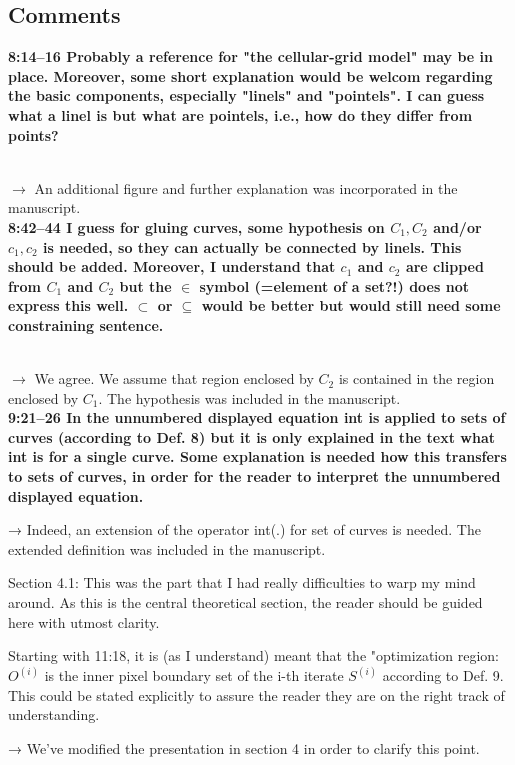 \documentclass[12pt]{article}
\begin{document}
\subsection{Comments}

\textbf{8:14--16 Probably a reference for "the cellular-grid model" may be in place.
Moreover, some short explanation would be welcom regarding the basic
components, especially "linels" and "pointels". I can guess what a linel is
but what are pointels, i.e., how do they differ from points?}

~\\
$\rightarrow$ An additional figure and further explanation was incorporated in the manuscript.
~\\

\textbf{8:42--44 I guess for gluing curves, some hypothesis on $C_1, C_2$ and/or $c_1, c_2$
is needed, so they can actually be connected by linels. This should be added.
Moreover, I understand that $c_1$ and $c_2$ are clipped from $C_1$ and $C_2$ but the
$\in$ symbol (=element of a set?!) does not express this well. $\subset$ or
$\subseteq$ would be better but would still need some constraining sentence.}

~\\
$\rightarrow$ We agree. We assume that region enclosed by $C_2$ is contained in the region enclosed by $C_1$. The hypothesis was included in the manuscript.
~\\

\textbf{9:21--26 In the unnumbered displayed equation int is applied to sets of curves (according to Def. 8) but it is only explained in the text what int is for a single curve. Some explanation is needed how this transfers to sets of curves, in order for the reader to interpret the unnumbered displayed equation.}

→ Indeed, an extension of the operator int(.) for set of curves is needed. The extended definition was included in the manuscript.


Section 4.1: This was the part that I had really difficulties to warp my mind
around. As this is the central theoretical section, the reader should be
guided here with utmost clarity.


Starting with 11:18, it is (as I understand) meant that the "optimization
region: $O^{(i)}$ is the inner pixel boundary set of the i-th iterate $S^{(i)}$
according to Def. 9. This could be stated explicitly to assure the reader they
are on the right track of understanding.

→ We’ve modified the presentation in section 4 in order to clarify this point.
\end{document}
